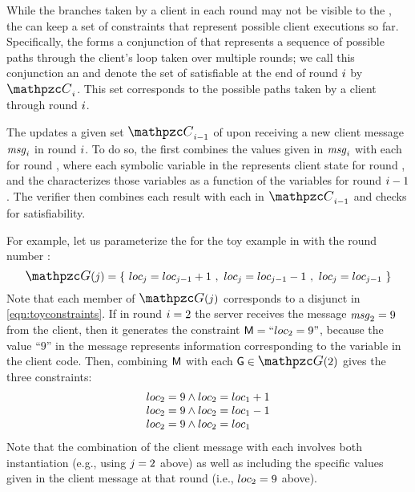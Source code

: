While the branches taken by a client in each round may not be visible
to the \verifier, the \verifier can keep a set of constraints that
represent possible client executions so far.  Specifically, the
\verifier forms a conjunction of \pathsegcons that represents a
sequence of possible paths through the client's loop taken over
multiple rounds; we call this conjunction an {\em \execpathcon } and
denote the set of satisfiable \execpathcons at the end of round
$i$ by $\execPathConstraints_{\roundidx}$. This set
corresponds to the possible paths taken by a client through round
$i$.

The \verifier updates a given set $\execPathConstraints_{\roundidx-1}$
of \execpathcons upon receiving a new client message
$\mathit{msg}_{i}$ in round $i$.  To do so, the
\verifier first combines the values given in $\mathit{msg}_{i}$
with each \pathsegcon for round \roundidx, where each symbolic
variable in the \pathsegcon represents client state for round
\roundidx, and the \pathsegcon characterizes those variables as a
function of the variables for round $i-1$.  The verifier then
combines each result with each \execpathcon in
$\execPathConstraints_{\roundidx-1}$ and checks for satisfiability.

For example, let us parameterize the \pathsegcons for the toy example
in  with the round number
\genidx:
\[
\genericPathConstraints(\genidx) =
\{~\toyloc_\genidx = \toyloc_{\genidx-1} + 1~,~
   \toyloc_\genidx = \toyloc_{\genidx-1} - 1~,~
   \toyloc_\genidx = \toyloc_{\genidx-1}~\}
\]
\noindent
Note that each member of $\genericPathConstraints(\genidx)$
corresponds to a disjunct in \eqref{eqn:toyconstraints}.  If in round
$i = 2$ the server receives the message $\mathit{msg}_2 = 9$
from the client, then it generates the constraint $\mathsf M\space =
\mbox{``$loc_2 = 9$''}$, because the value ``$9$'' in the message
represents information corresponding to the variable \toyloc in the
client code.  Then, combining $\mathsf M\space$ with each
$\genericPathConstraint \in \genericPathConstraints(2)$ gives the
three constraints:
\[\begin{array}{l}
loc_2 = 9 \wedge loc_2 = loc_1+1\\
loc_2 = 9 \wedge loc_2 = loc_1-1\\
loc_2 = 9 \wedge loc_2 = loc_1
\end{array}
\]
Note that the combination of the client message with each 
\pathsegcon involves both instantiation
(e.g., using $j=2$ above) as well as including the specific
values given in the client message at that round (i.e., $loc_2 =
9$ above).

